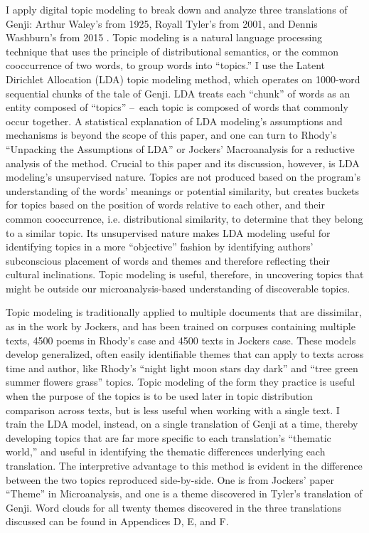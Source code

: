 \documentclass[12pt]{article}
\begin{document}
\begin{flushleft}
\begin{spacing}{2.0}
I apply digital topic modeling to break down and analyze three translations of Genji: Arthur Waley’s from 1925, Royall Tyler’s from 2001, and Dennis Washburn’s from 2015 . Topic modeling is a natural language processing technique that uses the principle of distributional semantics, or the common cooccurrence of two words, to group words into “topics.” I use the Latent Dirichlet Allocation (LDA) topic modeling method, which operates on 1000-word sequential chunks of the tale of Genji. LDA treats each “chunk” of words as an entity composed of “topics” – each topic is composed of words that commonly occur together. A statistical explanation of LDA modeling’s assumptions and mechanisms is beyond the scope of this paper, and one can turn to Rhody’s “Unpacking the Assumptions of LDA” or Jockers’ Macroanalysis for a reductive analysis of the method. Crucial to this paper and its discussion, however, is LDA modeling’s unsupervised nature. Topics are not produced based on the program’s understanding of the words’ meanings or potential similarity, but creates buckets for topics based on the position of words relative to each other, and their common cooccurrence, i.e. distributional similarity, to determine that they belong to a similar topic. Its unsupervised nature makes LDA modeling useful for identifying topics in a more “objective” fashion by identifying authors’ subconscious placement of words and themes and therefore reflecting their cultural inclinations. Topic modeling is useful, therefore, in uncovering topics that might be outside our microanalysis-based understanding of discoverable topics.  

Topic modeling is traditionally applied to multiple documents that are dissimilar, as in the work by Jockers, and has been trained on corpuses containing multiple texts, 4500 poems in Rhody’s case and 4500 texts in Jockers case. These models develop generalized, often easily identifiable themes that can apply to texts across time and author, like Rhody’s “night light moon stars day dark” and “tree green summer flowers grass” topics. Topic modeling of the form they practice is useful when the purpose of the topics is to be used later in topic distribution comparison across texts, but is less useful when working with a single text. I train the LDA model, instead, on a single translation of Genji at a time, thereby developing topics that are far more specific to each translation’s “thematic world,” and useful in identifying the thematic differences underlying each translation. The interpretive advantage to this method is evident in the difference between the two topics reproduced side-by-side. One is from Jockers’ paper “Theme” in Microanalysis, and one is a theme discovered in Tyler’s translation of Genji. Word clouds for all twenty themes discovered in the three translations discussed can be found in Appendices D, E, and F.


\end{spacing}
\end{flushleft}
\end{document}

